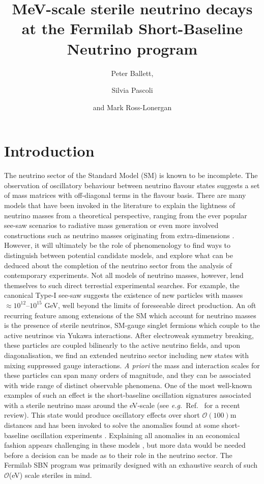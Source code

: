 \documentclass[11pt, a4paper]{article}
\title{MeV-scale sterile neutrino decays at the Fermilab Short-Baseline Neutrino program}
\author{Peter Ballett,}
\author{Silvia Pascoli}
\author{and Mark Ross-Lonergan}
\affiliation{Institute for Particle Physics Phenomenology, Department of
Physics, Durham University, South Road, Durham DH1 3LE, United Kingdom}
\newcommand{\refref}[1]{Ref.~\cite{#1}}
\def\eg{\emph{e.g.}}
\begin{document}
 

\maketitle

\section{Introduction}

The neutrino sector of the Standard Model (SM) is known to be incomplete. The
observation of oscillatory behaviour between neutrino flavour states
\cite{Fukuda:1998mi} suggests a set of mass matrices with off-diagonal terms in
the flavour basis. There are many models that have been invoked in the
literature to explain the lightness of neutrino masses from a theoretical
perspective, ranging from the ever popular see-saw scenarios
\cite{Minkowski:1977sc, GellMann:1980vs, Mohapatra:1979ia} to radiative mass
generation \cite{Zee:1980ai,Babu:1988ki} or even more involved constructions
such as neutrino masses originating from extra-dimensions \cite{ArkaniHamed:1998vp}.
However, it will ultimately be the role of phenomenology to find ways to
distinguish between potential candidate models, and explore what can be deduced
about the completion of the neutrino sector from the analysis of contemporary
experiments.
%
Not all models of neutrino masses, however, lend themselves to such direct terrestial
experimental searches. For example, the canonical Type-I see-saw
\cite{Minkowski:1977sc, GellMann:1980vs, Mohapatra:1979ia} suggests the
existence of new particles with masses  $\approx 10^{12}$--$10^{15}$ GeV, well
beyond the limits of foreseeable direct production. An oft recurring feature
among extensions of the SM which account for neutrino masses is the presence of
sterile neutrinos, SM-gauge singlet fermions which couple to the active
neutrinos via Yukawa interactions. After electroweak symmetry breaking, these
particles are coupled bilinearly to the active neutrino fields, and upon
diagonalisation, we find an extended neutrino sector including new states with
mixing suppressed gauge interactions. \emph{A priori} the mass and interaction
scales for these particles can span many orders of magnitude, and they can be
associated with wide range of distinct observable phenomena. 
%
One of the most well-known examples of such an effect is the short-baseline
oscillation signatures associated with a sterile neutrino mass around
the eV-scale (see \eg\ \refref{Gariazzo:2015rra} for a recent review). This
state would produce oscillatory effects over short $\mathcal{O}(100)$m
distances and has been invoked to solve the anomalies found at some
short-baseline oscillation experiments
\cite{Aguilar:2001ty,Aguilar-Arevalo:2013pmq,AguilarArevalo:2008rc}.
Explaining all anomalies in an economical fashion appears challenging in these
models \cite{Kopp:2013vaa,Conrad:2012qt}, but more data would be needed before
a decision can be made as to their role in the neutrino sector. The Fermilab
SBN \cite{Antonello:2015lea} program was primarily designed with an exhaustive
search of such $\mathcal{O}$(eV) scale steriles in mind.
\end{document}
